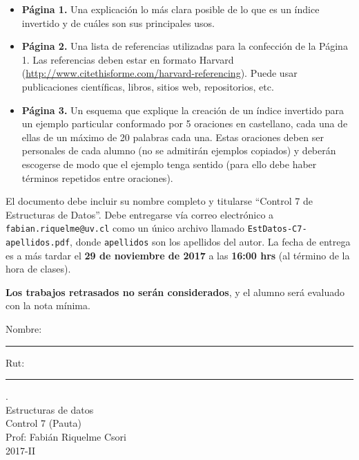 \documentclass[letter,12pt,oneside]{book}
\theoremstyle{definition}
\begin{document}
  \begin{itemize}
    \item \textbf{Página 1.} Una explicación lo más clara posible de lo que es un índice invertido y de cuáles son sus principales usos. \tabto{86ex}{[25 pts]}
    \item \textbf{Página 2.} Una lista de referencias utilizadas para la confección de la Página 1. Las referencias deben estar en formato Harvard (\url{http://www.citethisforme.com/harvard-referencing}). Puede usar publicaciones científicas, libros, sitios web, repositorios, etc. \tabto{87ex}{[5 pts]}
    \item \textbf{Página 3.} Un esquema que explique la creación de un índice invertido para un ejemplo particular conformado por 5 oraciones en castellano, cada una de ellas de un máximo de 20 palabras cada una. Estas oraciones deben ser personales de cada alumno (no se admitirán ejemplos copiados) y deberán escogerse de modo que el ejemplo tenga sentido (para ello debe haber términos repetidos entre oraciones). \tabto{86ex}{[30 pts]}
  \end{itemize}
  
  El documento debe incluir su nombre completo y titularse ``Control 7 de Estructuras de Datos''. Debe entregarse vía correo electrónico a \texttt{fabian.riquelme@uv.cl} como un único archivo llamado \texttt{EstDatos-C7-apellidos.pdf}, donde \texttt{apellidos} son los apellidos del autor. La fecha de entrega es a más tardar el \textbf{29 de noviembre de 2017} a las \textbf{16:00 hrs} (al término de la hora de clases).
  
  \textbf{Los trabajos retrasados no serán considerados}, y el alumno será evaluado con la nota mínima.
  
\newpage
\noindent
Nombre: \rule{.6\textwidth}{.5pt} Rut: \rule{.24\textwidth}{.5pt}

\begin{center}
 {\Large
  {\color{white}.}\\
  Estructuras de datos\\[1ex]
  Control 7 (Pauta)}\\[1.2ex]
  Prof: Fabián Riquelme Csori\\
  2017-II
\end{center}
\end{document}
